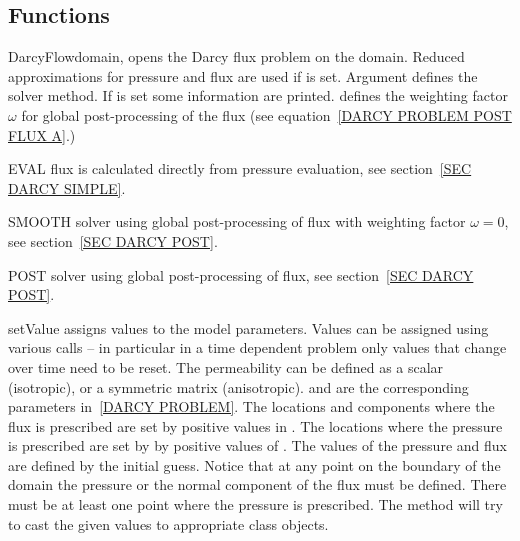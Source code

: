 \subsection{Functions}
\begin{classdesc}{DarcyFlow}{domain, }
opens the Darcy flux problem on the \Domain domain. 
Reduced approximations for pressure and flux are used if  is set.
Argument  defines the solver method. 
If  is set some information are printed.
 defines the weighting factor $\omega$ for global post-processing of the flux (see equation~\ref{DARCY PROBLEM POST FLUX A}.)
\end{classdesc}

\begin{memberdesc}[DarcyFlow]{EVAL}
flux is calculated directly from pressure evaluation, see section~\ref{SEC DARCY SIMPLE}.
\end{memberdesc}

\begin{memberdesc}[DarcyFlow]{SMOOTH}
solver using global post-processing of flux with weighting factor $\omega=0$, see section~\ref{SEC DARCY POST}. 
\end{memberdesc}

\begin{memberdesc}[DarcyFlow]{POST}
solver using global post-processing of flux, see section~\ref{SEC DARCY POST}. 
\end{memberdesc}

\begin{methoddesc}[DarcyFlow]{setValue}{}
assigns values to the model parameters. Values can be assigned using various
calls -- in particular in a time dependent problem only values that change
over time need to be reset. The permeability can be defined as a scalar
(isotropic), or a symmetric matrix (anisotropic).
 and  are the corresponding parameters in~\ref{DARCY PROBLEM}.
The locations and components where the flux is prescribed are set by positive
values in .
The locations where the pressure is prescribed are set by by positive values
of .
The values of the pressure and flux are defined by the initial guess.
Notice that at any point on the boundary of the domain the pressure or the
normal component of the flux must be defined. There must be at least one point
where the pressure is prescribed.
The method will try to cast the given values to appropriate \Data class objects.
\end{methoddesc}


